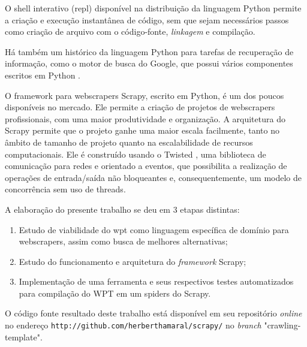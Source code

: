 O shell interativo (\gls{repl}) disponível na distribuição da linguagem Python permite a criação e execução instantânea de código, sem que sejam necessários passos como criação de arquivo com o código-fonte, \emph{linkagem} e compilação.

Há também um histórico da linguagem Python para tarefas de recuperação de informação, como o motor de busca do Google, que possui vários componentes escritos em Python \cite{google}.

O framework para \glspl{webscraper} Scrapy, escrito em Python, é um dos poucos disponíveis no mercado. Ele permite a criação de projetos de \glspl{webscraper} profissionais, com uma maior produtividade e organização. A arquitetura do Scrapy permite que o projeto ganhe uma maior escala facilmente, tanto no âmbito de tamanho de projeto quanto na escalabilidade de recursos computacionais. Ele é construído usando o Twisted \cite{twisted}, uma biblioteca de comunicação para redes e orientado a eventos, que possibilita a realização de operações de entrada/saída não bloqueantes e, consequentemente, um modelo de concorrência sem uso de threads. 

A elaboração do presente trabalho se deu em 3 etapas distintas:

\begin{enumerate}
	\item Estudo de viabilidade do \gls{wpt} como linguagem específica de domínio para \glspl{webscraper}, assim como busca de melhores alternativas;
	\item Estudo do funcionamento e arquitetura do \emph{framework} Scrapy;
	\item Implementação de uma ferramenta e seus respectivos testes automatizados para compilação do WPT em um \glspl{spider} do Scrapy.
\end{enumerate}

O código fonte resultado deste trabalho está disponível em seu repositório \emph{online} no endereço  \texttt{http://github.com/herberthamaral/scrapy/} no \emph{branch} "crawling-template".
